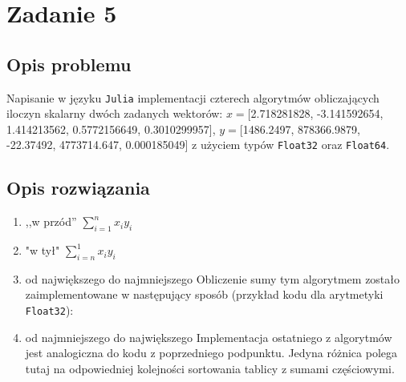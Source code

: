\documentclass{classrep}
\begin{document}
\section{Zadanie 5}
	\subsection{Opis problemu}
		Napisanie w języku \texttt{Julia} implementacji czterech algorytmów obliczających iloczyn skalarny dwóch 
		zadanych wektorów: 
		$x=$[2.718281828, -3.141592654, 1.414213562, 0.5772156649, 0.3010299957], 
		$y=$[1486.2497, 878366.9879, -22.37492, 4773714.647, 0.000185049] z użyciem typów \texttt{Float32} oraz 
		\texttt{Float64}.
	\subsection{Opis rozwiązania}
		\begin{enumerate}
			\item ,,w przód''
			\newline
			$\sum_{i=1}^{n} x_iy_i$
			
%					
			
			
			\item "w tył"
			\newline
			$\sum_{i=n}^{1} x_iy_i$
			\newline
			
			\item od największego do najmniejszego
			\newline
			Obliczenie sumy tym algorytmem zostało zaimplementowane w następujący sposób (przykład kodu dla arytmetyki \texttt{Float32}):
%
%
%
%			
			
			
			\item od najmniejszego do największego
			\newline
			Implementacja ostatniego z algorytmów jest analogiczna do kodu z poprzedniego podpunktu. Jedyna różnica polega tutaj na odpowiedniej kolejności sortowania tablicy z sumami częściowymi.			
		\end{enumerate}
\end{document}
